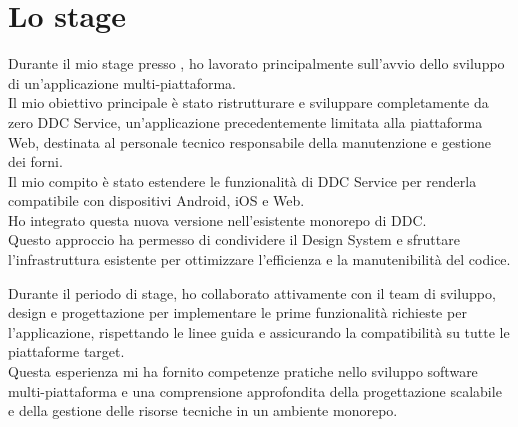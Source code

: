 \section{Lo stage}
Durante il mio stage presso \myAzienda, ho lavorato principalmente sull'avvio dello sviluppo di un'applicazione multi-piattaforma.
\\Il mio obiettivo principale è stato ristrutturare e sviluppare completamente da zero DDC Service, un'applicazione precedentemente limitata alla piattaforma Web, destinata al personale tecnico responsabile della manutenzione e gestione dei forni.
\\Il mio compito è stato estendere le funzionalità di DDC Service per renderla compatibile con dispositivi Android, iOS e Web.
\\Ho integrato questa nuova versione nell'esistente monorepo di DDC.
\\Questo approccio ha permesso di condividere il Design System e sfruttare l'infrastruttura esistente per ottimizzare l'efficienza e la manutenibilità del codice.

Durante il periodo di stage, ho collaborato attivamente con il team di sviluppo, design e progettazione per implementare le prime funzionalità richieste per l'applicazione, rispettando le linee guida e assicurando la compatibilità su tutte le piattaforme target. 
\\Questa esperienza mi ha fornito competenze pratiche nello sviluppo software multi-piattaforma e una comprensione approfondita della progettazione scalabile e della gestione delle risorse tecniche in un ambiente monorepo.
\newpage